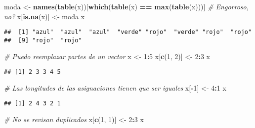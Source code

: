 \documentclass[]{article}
\newenvironment{Shaded}{\begin{snugshade}}{\end{snugshade}}
\newcommand{\KeywordTok}[1]{\textcolor[rgb]{0.13,0.29,0.53}{\textbf{#1}}}
\newcommand{\DecValTok}[1]{\textcolor[rgb]{0.00,0.00,0.81}{#1}}
\newcommand{\StringTok}[1]{\textcolor[rgb]{0.31,0.60,0.02}{#1}}
\newcommand{\CommentTok}[1]{\textcolor[rgb]{0.56,0.35,0.01}{\textit{#1}}}
\newcommand{\OperatorTok}[1]{\textcolor[rgb]{0.81,0.36,0.00}{\textbf{#1}}}
\newcommand{\NormalTok}[1]{#1}
\begin{document}
\begin{Shaded}
\begin{Highlighting}[]
\NormalTok{moda <-}\StringTok{ }\KeywordTok{names}\NormalTok{(}\KeywordTok{table}\NormalTok{(x))[}\KeywordTok{which}\NormalTok{(}\KeywordTok{table}\NormalTok{(x) }\OperatorTok{==}\StringTok{ }\KeywordTok{max}\NormalTok{(}\KeywordTok{table}\NormalTok{(x)))] }\CommentTok{# Engorroso, no?}
\NormalTok{x[}\KeywordTok{is.na}\NormalTok{(x)] <-}\StringTok{ }\NormalTok{moda}
\NormalTok{x}
\end{Highlighting}
\end{Shaded}

\begin{verbatim}
##  [1] "azul"  "azul"  "azul"  "verde" "rojo"  "verde" "rojo"  "rojo" 
##  [9] "rojo"  "rojo"
\end{verbatim}

\begin{Shaded}
\begin{Highlighting}[]
\CommentTok{# Puedo reemplazar partes de un vector}
\NormalTok{x <-}\StringTok{ }\DecValTok{1}\OperatorTok{:}\DecValTok{5}
\NormalTok{x[}\KeywordTok{c}\NormalTok{(}\DecValTok{1}\NormalTok{, }\DecValTok{2}\NormalTok{)] <-}\StringTok{ }\DecValTok{2}\OperatorTok{:}\DecValTok{3}
\NormalTok{x}
\end{Highlighting}
\end{Shaded}

\begin{verbatim}
## [1] 2 3 3 4 5
\end{verbatim}

\begin{Shaded}
\begin{Highlighting}[]
\CommentTok{# Las longitudes de las asignaciones tienen que ser iguales}
\NormalTok{x[}\OperatorTok{-}\DecValTok{1}\NormalTok{] <-}\StringTok{ }\DecValTok{4}\OperatorTok{:}\DecValTok{1}
\NormalTok{x}
\end{Highlighting}
\end{Shaded}

\begin{verbatim}
## [1] 2 4 3 2 1
\end{verbatim}

\begin{Shaded}
\begin{Highlighting}[]
\CommentTok{# No se revisan duplicados}
\NormalTok{x[}\KeywordTok{c}\NormalTok{(}\DecValTok{1}\NormalTok{, }\DecValTok{1}\NormalTok{)] <-}\StringTok{ }\DecValTok{2}\OperatorTok{:}\DecValTok{3}
\NormalTok{x}
\end{Highlighting}
\end{Shaded}
\end{document}
